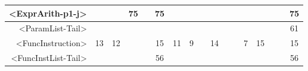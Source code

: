 \begin{tabular}{r|c@{ }c@{ }c@{ }c@{ }c@{ }c@{ }c@{ }c@{ }c@{ }c@{ }c@{ }c@{ }c@{ }c@{ }c@{ }c@{ }}
<ExprArith-p1-j> &   &   & 75 &   & 75 &   &   &   &   &   &   &   &   &   &   & 75 \\\hline
<ParamList-Tail> &   &   &   &   &   &   &   &   &   &   &   &   &   &   &   & 61 \\\hline
<FuncInstruction> & 13 & 12 &   &   & 15 & 11 & 9 &   & 14 &   &   & 7 & 15 &   &   & 15 \\\hline
<FuncInstList-Tail> &   &   &   &   & 56 &   &   &   &   &   &   &   &   &   &   & 56 \\\hline
\end{tabular}



